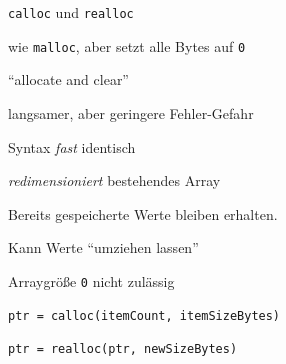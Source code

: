 
\begin{frame}[fragile]{\texttt{calloc} und \texttt{realloc}}
%
%
\begin{itembox}
\item wie \texttt{malloc}, aber setzt alle Bytes auf \texttt{0}
\item \enquote{allocate and clear}
\item langsamer, aber geringere Fehler-Gefahr
\item Syntax \emph{fast} identisch
\end{itembox}
%
\begin{itembox}
\item \emph{redimensioniert} bestehendes Array
\item Bereits gespeicherte Werte bleiben erhalten.
\item Kann Werte \enquote{umziehen lassen}
\item Arraygröße \texttt{0} nicht zulässig
\end{itembox}

\vspace{3pt}
%
\begin{codebox}[Syntax]
\begin{verbatim}
ptr = calloc(itemCount, itemSizeBytes)
\end{verbatim}
\end{codebox}
%
\begin{codebox}[Syntax]
\begin{verbatim}
ptr = realloc(ptr, newSizeBytes)
\end{verbatim}
\end{codebox}
%
\end{frame}


